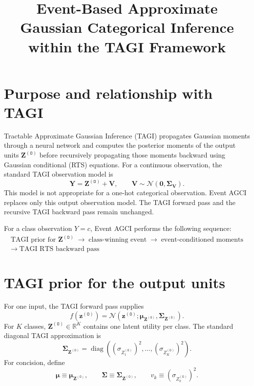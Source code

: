 \documentclass[11pt]{article}
\title{Event-Based Approximate Gaussian Categorical Inference\\
within the TAGI Framework}
\author{}
\date{}
\newcommand{\Normal}{\mathcal{N}}
\newcommand{\diag}{\operatorname{diag}}
\newcommand{\Olayer}{\mathtt{O}}
\begin{document}
\maketitle

\section{Purpose and relationship with TAGI}

Tractable Approximate Gaussian Inference (TAGI) propagates Gaussian moments
through a neural network and computes the posterior moments of the output units
$\bm Z^{(\Olayer)}$ before recursively propagating those moments backward using
Gaussian conditional (RTS) equations.  For a continuous observation, the
standard TAGI observation model is
\begin{equation}
    \bm Y = \bm Z^{(\Olayer)} + \bm V,
    \qquad
    \bm V \sim \Normal(\bm 0,\bm\Sigma_{\bm V}).
\end{equation}
This model is not appropriate for a one-hot categorical observation.  Event
AGCI replaces only this output observation model.  The TAGI forward pass and
the recursive TAGI backward pass remain unchanged.

For a class observation $Y=c$, Event AGCI performs the following sequence:
\begin{equation}
\boxed{
\begin{gathered}
\text{TAGI prior for }\bm Z^{(\Olayer)}
\;\longrightarrow\;
\text{class-winning event}
\;\longrightarrow\;
\text{event-conditioned moments}
\\[-0.2em]
\longrightarrow\;
\text{TAGI RTS backward pass}
\end{gathered}}
\end{equation}

\section{TAGI prior for the output units}

For one input, the TAGI forward pass supplies
\begin{equation}
 f(\bm z^{(\Olayer)})
 =
 \Normal\!\left(
 \bm z^{(\Olayer)};
 \bm\mu_{\bm Z^{(\Olayer)}},
 \bm\Sigma_{\bm Z^{(\Olayer)}}
 \right).
 \label{eq:tagi-output-prior}
\end{equation}
For $K$ classes, $\bm Z^{(\Olayer)}\in\mathbb R^K$ contains one latent
utility per class.  The standard diagonal TAGI approximation is
\begin{equation}
 \bm\Sigma_{\bm Z^{(\Olayer)}}
 =
 \diag\!\left(
 (\sigma_{Z_1^{(\Olayer)}})^2,
 \ldots,
 (\sigma_{Z_K^{(\Olayer)}})^2
 \right).
 \label{eq:diagonal-output-prior}
\end{equation}
For concision, define
\begin{equation}
 \bm\mu \equiv \bm\mu_{\bm Z^{(\Olayer)}},
 \qquad
 \bm\Sigma \equiv \bm\Sigma_{\bm Z^{(\Olayer)}},
 \qquad
 v_k \equiv (\sigma_{Z_k^{(\Olayer)}})^2.
\end{equation}
\end{document}
